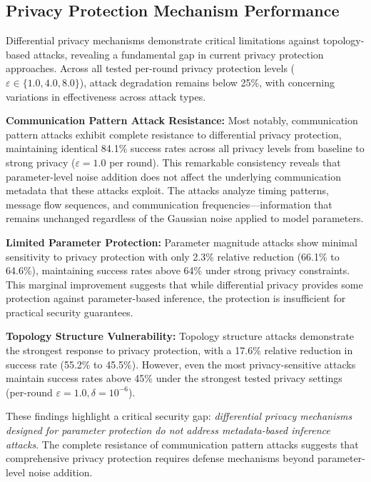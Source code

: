 \subsection{Privacy Protection Mechanism Performance}

Differential privacy mechanisms demonstrate critical limitations against topology-based attacks, revealing a fundamental gap in current privacy protection approaches. Across all tested per-round privacy protection levels ($\varepsilon \in \{1.0, 4.0, 8.0\}$), attack degradation remains below 25\%, with concerning variations in effectiveness across attack types.

\textbf{Communication Pattern Attack Resistance:} Most notably, communication pattern attacks exhibit complete resistance to differential privacy protection, maintaining identical 84.1\% success rates across all privacy levels from baseline to strong privacy ($\varepsilon = 1.0$ per round). This remarkable consistency reveals that parameter-level noise addition does not affect the underlying communication metadata that these attacks exploit. The attacks analyze timing patterns, message flow sequences, and communication frequencies—information that remains unchanged regardless of the Gaussian noise applied to model parameters.

\textbf{Limited Parameter Protection:} Parameter magnitude attacks show minimal sensitivity to privacy protection with only 2.3\% relative reduction (66.1\% to 64.6\%), maintaining success rates above 64\% under strong privacy constraints. This marginal improvement suggests that while differential privacy provides some protection against parameter-based inference, the protection is insufficient for practical security guarantees.

\textbf{Topology Structure Vulnerability:} Topology structure attacks demonstrate the strongest response to privacy protection, with a 17.6\% relative reduction in success rate (55.2\% to 45.5\%). However, even the most privacy-sensitive attacks maintain success rates above 45\% under the strongest tested privacy settings (per-round $\varepsilon = 1.0, \delta = 10^{-6}$).

These findings highlight a critical security gap: \textit{differential privacy mechanisms designed for parameter protection do not address metadata-based inference attacks}. The complete resistance of communication pattern attacks suggests that comprehensive privacy protection requires defense mechanisms beyond parameter-level noise addition.


